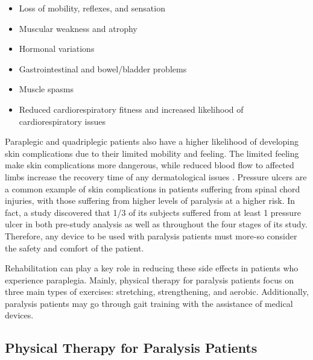 \begin{itemize}
    \item Loss of mobility, reflexes, and sensation
    \item Muscular weakness and atrophy
    \item Hormonal variations
    \item Gastrointestinal and bowel/bladder problems
    \item Muscle spasms
    \item Reduced cardiorespiratory fitness and increased likelihood of cardiorespiratory issues
\end{itemize}

Paraplegic and quadriplegic patients also have a higher likelihood of developing skin complications due to their limited mobility and feeling. The limited feeling make skin complications more dangerous, while reduced blood flow to affected limbs increase the recovery time of any dermatological issues \cite{SPISecondaryEffects}. Pressure ulcers are a common example of skin complications in patients suffering from spinal chord injuries, with those suffering from higher levels of paralysis at a higher risk. In fact, a study \cite{PressureUlcerRiskParalysis} discovered that 1/3 of its subjects suffered from at least 1 pressure ulcer in both pre-study analysis as well as throughout the four stages of its study. Therefore, any device to be used with paralysis patients must more-so consider the safety and comfort of the patient.

Rehabilitation can play a key role in reducing these side effects in patients who experience paraplegia. Mainly, physical therapy for paralysis patients focus on three main types of exercises: stretching, strengthening, and aerobic. Additionally, paralysis patients may go through gait training with the assistance of medical devices.

\subsection{Physical Therapy for Paralysis Patients}

